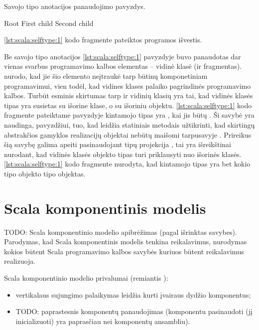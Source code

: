 \begin{listing}[H]
  \caption{Savojo tipo anotacijos panaudojimo pavyzdys.}
  \label{lst:scala:selftype:1}
\end{listing}

\begin{listing}[H]
  \begin{textcode}
    Root
    First child
    Second child
  \end{textcode}
  \caption{\ref{lst:scala:selftype:1} kodo fragmente pateiktos programos
  išvestis.}
  \label{lst:scala:selftype:2}
\end{listing}

Be savojo tipo anotacijos \ref{lst:scala:selftype:1} pavyzdyje buvo
panaudotas dar vienas svarbus programavimo kalbos elementas – vidinė
klasė (ir fragmentas). \cite[12]{scalable-component-abstractions}
nurodo, kad jie šio elemento neįtraukė tarp būtinų komponetiniam
programavimui, vien todėl, kad vidines klases palaiko pagrindinės
 programavimo kalbos. Turbūt esminis skirtumas tarp
 ir  vidinių klasių yra tai, kad
 vidinės klasės tipas yra susietas su išorine klase,
o  su išoriniu objektu. \ref{lst:scala:selftype:1}
kodo fragmente pateiktame pavyzdyje kintamojo  tipas
yra , kai  jis būtų
. Ši savybė yra naudinga, pavyzdžiui, tuo, kad 
leidžia statiniais metodais užtikrinti, kad skirtingų abstrakčios
gamyklos  realizacijų objektai nebūtų maišomi
tarpusavyje \cite[36]{scala-design-patterns}. Prireikus šią savybę
galima apeiti pasinaudojant tipų projekcija ,
tai yra išreikštinai nurodant, kad vidinės klasės objekto tipas
turi priklausyti nuo išorinės klasės. \ref{lst:scala:selftype:1}
kodo fragmente nurodyta, kad kintamojo  tipas yra
bet kokio  tipo objekto  tipo objektas.

\section{Scala komponentinis modelis}

TODO: Scala komponentinio modelio apibrėžimas (pagal išrinktas savybes).
Parodymas, kad Scala komponentinis modelis tenkina reikalavimus,
nurodymas kokios būtent Scala programavimo kalbos savybės kuriuos
būtent reikalavimus realizuoja.

Scala komponentinio modelio privalumai (remiantis
\cite{classification-framework-for-scm}):
\begin{itemize}
  \item vertikalaus sujungimo\cite[599]{classification-framework-for-scm}
    palaikymas leidžia kurti įvairaus dydžio  komponentus;
  \item TODO: paprastesnis komponentų panaudojimas (komponentu
    pasinaudoti (jį inicializuoti) yra paprasčiau nei komponentų
    ansambliu).
\end{itemize}

